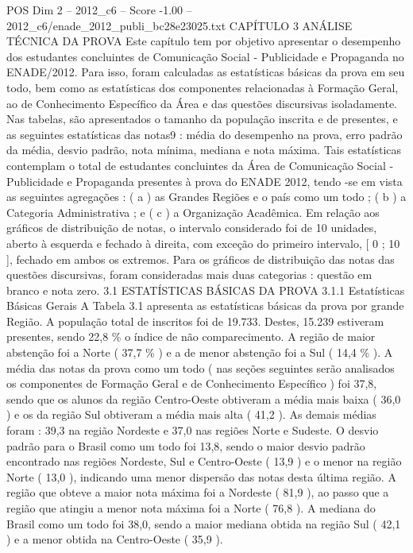 \begin{textsample}{POS Dim 2 – 2012\_c6 – Score -1.00 – 2012\_c6/enade\_2012\_publi\_bc28e23025.txt}  \label{ex:f2_pos_247}
CAPÍTULO 3 ANÁLISE TÉCNICA DA PROVA Este capítulo tem por objetivo apresentar o desempenho dos estudantes concluintes de Comunicação Social - Publicidade e Propaganda no ENADE/2012.
Para isso, foram calculadas as estatísticas básicas da prova em seu todo, bem como as estatísticas dos componentes relacionadas à Formação Geral, ao de Conhecimento Específico da Área e das questões discursivas isoladamente.
Nas tabelas, são apresentados o tamanho da população inscrita e de presentes, e as seguintes estatísticas das notas9 : média do desempenho na prova, erro padrão da média, desvio padrão, nota mínima, mediana e nota máxima.
Tais estatísticas contemplam o total de estudantes concluintes da Área de Comunicação Social - Publicidade e Propaganda presentes à prova do ENADE 2012, tendo -se em vista as seguintes agregações : ( a ) as Grandes Regiões e o país como um todo ; ( b ) a Categoria Administrativa ; e ( c ) a Organização Acadêmica.
Em relação aos gráficos de distribuição de notas, o intervalo considerado foi de 10 unidades, aberto à esquerda e fechado à direita, com exceção do primeiro intervalo, [ 0 ; 10 ], fechado em ambos os extremos.
Para os gráficos de distribuição das notas das questões discursivas, foram consideradas mais duas categorias : questão em branco e nota zero. 3.1 ESTATÍSTICAS BÁSICAS DA PROVA 3.1.1 Estatísticas Básicas Gerais A Tabela 3.1 apresenta as estatísticas básicas da prova por grande Região.
A população total de inscritos foi de 19.733.
Destes, 15.239 estiveram presentes, sendo 22,8 \% o índice de não comparecimento.
A região de maior abstenção foi a Norte ( 37,7 \% ) e a de menor abstenção foi a Sul ( 14,4 \% ).
A média das notas da prova como um todo ( nas seções seguintes serão analisados os componentes de Formação Geral e de Conhecimento Específico ) foi 37,8, sendo que os alunos da região Centro-Oeste obtiveram a média mais baixa ( 36,0 ) e os da região Sul obtiveram a média mais alta ( 41,2 ).
As demais médias foram : 39,3 na região Nordeste e 37,0 nas regiões Norte e Sudeste.
O desvio padrão para o Brasil como um todo foi 13,8, sendo o maior desvio padrão encontrado nas regiões Nordeste, Sul e Centro-Oeste ( 13,9 ) e o menor na região Norte ( 13,0 ), indicando uma menor dispersão das notas desta última região.
A região que obteve a maior nota máxima foi a Nordeste ( 81,9 ), ao passo que a região que atingiu a menor nota máxima foi a Norte ( 76,8 ).
A mediana do Brasil como um todo foi 38,0, sendo a maior mediana obtida na região Sul ( 42,1 ) e a menor obtida na Centro-Oeste ( 35,9 ).

\end{textsample}
